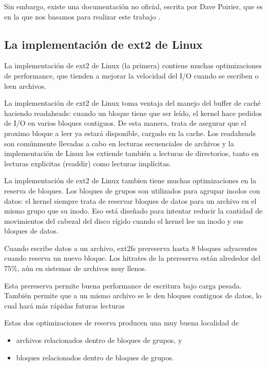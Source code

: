 Sin embargo, existe una documentación no oficial, escrita por Dave Poirier, que es en la que nos basamos para realizar este trabajo \cite{ext2doc}.

\subsection{La implementación de ext2 de Linux}

La implementación de ext2 de Linux (la primera) contiene muchas optimizaciones de performance, que tienden a mejorar la velocidad del I/O cuando se escriben o leen archivos.

La implementación de ext2 de Linux toma ventaja del manejo del buffer de caché haciendo readaheads: cuando un bloque tiene que ser leído, el kernel hace pedidos de I/O en varios bloques contiguos. De esta manera, trata de asegurar que el proximo bloque a leer ya estará disponible, cargado en la cache. Los readaheads son comúnmente llevadas a cabo en lecturas secuenciales de archivos y la implementación de Linux los extiende también a lecturas de directorios, tanto en lecturas explicitas (readdir) como lecturas implícitas.

La implementación de ext2 de Linux tambien tiene muchas optimizaciones en la reserva de bloques. Los bloques de grupos son utilizados para agrupar inodos con datos: el kernel siempre trata de reservar bloques de datos para un archivo en el mismo grupo que su inodo. Eso está diseñado para intentar reducir la cantidad de movimientos del cabezal del disco rígido cuando el kernel lee un inodo y sus bloques de datos.

Cuando escribe datos a un archivo, ext2fs prereserva hasta 8 bloques adyacentes cuando reserva un nuevo bloque. Los hitrates de la prereserva están alrededor del 75\%, aún en sistemas de archivos muy llenos.

Esta prereserva permite buena performance de escritura bajo carga pesada. También permite que a un mismo archivo se le den bloques contiguos de datos, lo cual hará más rápidas futuras lecturas

Estas dos optimizaciones de reserva producen una muy buena localidad de
\begin{itemize}
 \item archivos relacionados dentro de bloques de grupos, y
 \item bloques relacionados dentro de bloques de grupos.
\end{itemize}





